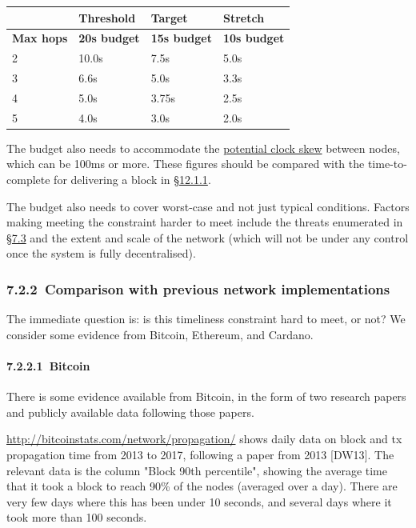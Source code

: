 \documentclass[]{article}
\let\oldparagraph\paragraph
\renewcommand{\paragraph}[1]{\oldparagraph{#1}\mbox{}}
\begin{document}
\begin{longtable}[]{@{}llll@{}}
\toprule
& Threshold & Target & Stretch\tabularnewline
\midrule
\endhead
\textbf{Max hops} & \textbf{20s budget} & \textbf{15s budget} &
\textbf{10s budget}\tabularnewline
2 & 10.0s & 7.5s & 5.0s\tabularnewline
3 & 6.6s & 5.0s & 3.3s\tabularnewline
4 & 5.0s & 3.75s & 2.5s\tabularnewline
5 & 4.0s & 3.0s & 2.0s\tabularnewline
\bottomrule
\end{longtable}

The budget also needs to accommodate the
\protect\hyperlink{time-synchronisation-constraints}{{potential clock
skew}} between nodes, which can be 100ms or more. These figures should
be compared with the time-to-complete for delivering a block in
\protect\hyperlink{time-to-transmit-a-block-of-given-size-across-given-latencies}{{§12.1.1}}.

The budget also needs to cover worst-case and not just typical
conditions. Factors making meeting the constraint harder to meet include
the threats enumerated in
\protect\hyperlink{high-level-threat-model}{{§7.3}} and the extent and
scale of the network (which will not be under any control once the
system is fully decentralised).

\hypertarget{comparison-with-previous-network-implementations}{%
\subsubsection{​7.2.2​~Comparison with previous network
implementations}\label{comparison-with-previous-network-implementations}}

The immediate question is: is this timeliness constraint hard to meet,
or not? We consider some evidence from Bitcoin, Ethereum, and Cardano.

\hypertarget{bitcoin}{%
\paragraph{​7.2.2.1​~Bitcoin}\label{bitcoin}}

There is some evidence available from Bitcoin, in the form of two
research papers and publicly available data following those papers.

\href{http://bitcoinstats.com/network/propagation/}{{http://bitcoinstats.com/network/propagation/}}
shows daily data on block and tx propagation time from 2013 to 2017,
following a paper from 2013 {[}DW13{]}. The relevant data is the column
"Block 90th percentile", showing the average time that it took a block
to reach 90\% of the nodes (averaged over a day). There are very few
days where this has been under 10 seconds, and several days where it
took more than 100 seconds.
\end{document}
